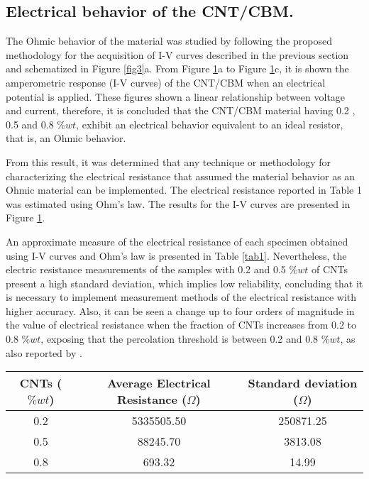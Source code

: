\documentclass[twocolumn]{bmcart}%
\begin{document}
\subsection{Electrical behavior of the CNT/CBM.}

The Ohmic behavior of the material was studied by following the proposed methodology for the acquisition of I-V curves described in the previous section and schematized in Figure \ref{fig3}a. From Figure \ref{fig8}a to Figure \ref{fig8}c, it is shown the amperometric response (I-V curves) of the CNT/CBM when an electrical potential is applied. These figures shown a linear relationship between voltage and current, therefore, it is concluded that the CNT/CBM material having 0.2 , 0.5 and 0.8 $\%wt$, exhibit an electrical behavior equivalent to an ideal resistor, that is, an Ohmic behavior.

From this result, it was determined that any technique or methodology for characterizing the electrical resistance that assumed the material behavior as an Ohmic material can be implemented. The electrical resistance reported in Table 1 was estimated using Ohm's law. The results for the I-V curves are presented in Figure \ref{fig8}.

\begin{figure}[h!]
  \caption{
      }
      \label{fig8}
      \end{figure}
  

An approximate measure of the electrical resistance of each specimen obtained using  I-V curves and Ohm's law is presented in Table \ref{tab1}. Nevertheless, the electric resistance measurements of the samples with 0.2  and 0.5 $\%wt$ of CNTs present a high standard deviation, which implies low reliability, concluding that it is necessary to implement measurement methods of the electrical resistance with higher accuracy. Also, it can be seen a change up to four orders of magnitude in the value of electrical resistance when the fraction of CNTs increases from 0.2  to 0.8 $\%wt$, exposing that the percolation threshold is between 0.2 and 0.8 $\%wt$, as also reported by \cite{Garcia-Macias2017}.

\begin{table*}[ht]
\caption{Electrical resistance values and their corresponding standard deviations obtained from the I-V curves characterization.}
\centering
\begin{tabular}{|c|c|c|}
\hline
\textbf{CNTs ($\% wt$)} & \textbf{Average Electrical Resistance ($\Omega$)} & \textbf{Standard deviation ($\Omega$)}\\
\hline
0.2 & 5335505.50 & 250871.25\\
\hline
0.5 & 88245.70 & 3813.08\\
\hline
0.8 & 693.32 & 14.99\\
\hline 

\end{tabular}
\label{tab1}
\end{table*}
\end{document}
